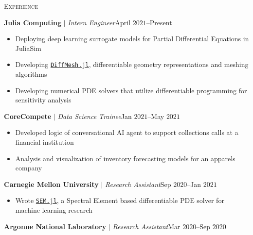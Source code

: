 \documentclass[10pt]{article}
\begin{document}
\begin{multicols}{2}
\textsc{Experience}
\columnbreak

\textbf{Julia Computing} $|$ \textit{Intern Engineer}\hfill April $2021$--Present

\vspace{-1.75em}
\begin{itemize}[label=-,leftmargin=1.0em]
    \setlength\itemsep{-0.25em}
    \item Deploying deep learning surrogate models for Partial Differential Equations in JuliaSim
    \item Developing \href{https://github.com/vpuri3/DiffMesh.jl}{\texttt{DiffMesh.jl}}, differentiable geometry representations and meshing algorithms
    \item Developing numerical PDE solvers that utilize differentiable programming for sensitivity analysis
\end{itemize}
\vspace{-2.0em}

\vspace{0.5em}
%
\textbf{CoreCompete} $|$ \textit{Data Science Trainee}\hfill Jan $2021$--May $2021$

\vspace{-1.75em}
\begin{itemize}[label=-,leftmargin=1.0em]
    \setlength\itemsep{-0.25em}
    \item Developed logic of conversational AI agent to support collections calls at a financial institution
    \item Analysis and visualization of inventory forecasting models for an apparels company
\end{itemize}
\vspace{-2.0em}

\vspace{0.5em}
%
\textbf{Carnegie Mellon University} $|$ \textit{Research Assistant}\hfill Sep $2020$--Jan $2021$

\vspace{-1.75em}
\begin{itemize}[label=-,leftmargin=1.0em]
    \setlength\itemsep{-0.25em}
    \item Wrote \href{https://github.com/vpuri3/SEM.jl}{\texttt{SEM.jl}}, a Spectral Element based differentiable PDE solver for machine learning research
\end{itemize}
\vspace{-2.0em}

\vspace{0.5em}
%
\textbf{Argonne National Laboratory} $|$ \textit{Research Assistant}\hfill Mar $2020$--Sep $2020$


\end{multicols}
\end{document}
